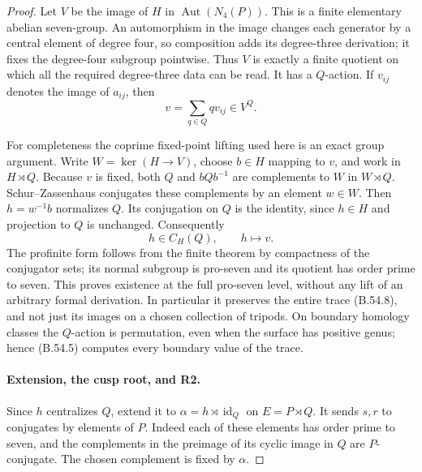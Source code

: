 \begin{proof}
Let $V$ be the image of $H$ in
$\operatorname{Aut}(N_4(P))$. This is a finite elementary
abelian seven-group. An automorphism in the image changes
each generator by a central element of degree four, so
composition adds its degree-three derivation; it fixes
the degree-four subgroup pointwise. Thus $V$ is exactly
a finite quotient on which all the required degree-three
data can be read. It has a $Q$-action. If $v_{ij}$ denotes
the image of $a_{ij}$, then
\[
                     v=\sum_{q\in Q}qv_{ij}\in V^Q.        \tag{B.54.8}
\]

For completeness the coprime fixed-point lifting used
here is an exact group argument. Write $W=\ker(H\to V)$,
choose $b\in H$ mapping to $v$, and work in $H\rtimes Q$.
Because $v$ is fixed, both $Q$ and $bQb^{-1}$ are
complements to $W$ in $W\rtimes Q$. Schur--Zassenhaus
conjugates these complements by an element $w\in W$.
Then $h=w^{-1}b$ normalizes $Q$. Its conjugation on $Q$
is the identity, since $h\in H$ and projection to $Q$
is unchanged. Consequently
\[
                  h\in C_H(Q),\qquad h\mapsto v.          \tag{B.54.9}
\]
The profinite form follows from the finite theorem by
compactness of the conjugator sets; its normal subgroup
is pro-seven and its quotient has order prime to seven.
This proves existence at the full pro-seven level,
without any lift of an arbitrary formal derivation.
In particular it preserves the entire trace (B.54.8),
and not just its images on a chosen collection of
tripods. On boundary homology classes the $Q$-action is
permutation, even when the surface has positive genus;
hence (B.54.5) computes every boundary value of the trace.

\paragraph{Extension, the cusp root, and R2.}
Since $h$ centralizes $Q$, extend it to
$\alpha=h\rtimes\operatorname{id}_Q$ on $E=P\rtimes Q$.
It sends $s,r$ to conjugates by elements of $P$. Indeed
each of these elements has order prime to seven, and
the complements in the preimage of its cyclic image
in $Q$ are $P$-conjugate. The chosen complement is
fixed by $\alpha$.


\end{proof}
